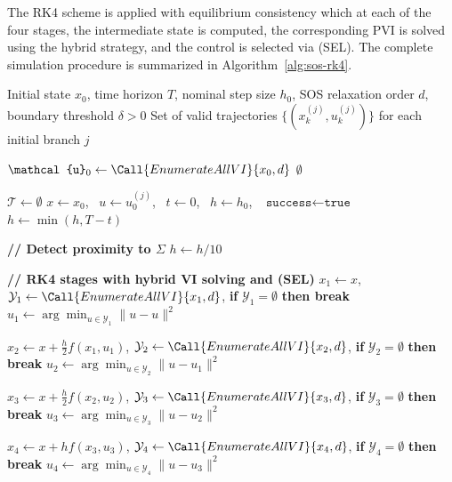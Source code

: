 \documentclass[sn-basic,Numbered]{sn-jnl}
\theoremstyle{thmstyleone}%
\begin{document}
The RK4 scheme is applied with equilibrium consistency which at each of the four stages, the intermediate state is computed, the corresponding PVI is solved using the hybrid strategy, and the control is selected via (SEL). The complete simulation procedure is summarized in Algorithm~\ref{alg:sos-rk4}.

\begin{algorithm}[htbp]
\caption{SOS-PDVIRK4 with Adaptive Hybrid VI Solver}
\label{alg:sos-rk4}
\begin{algorithmic}[1]
\Require 
    Initial state $x_0$, time horizon $T$, nominal step size $h_0$, 
    SOS relaxation order $d$, boundary threshold $\delta > 0$
\Ensure 
    Set of valid trajectories $\{(x_k^{(j)}, u_k^{(j)})\}$ for each initial branch $j$

\State $\mathcal{u}_0 \gets \Call{EnumerateAllVI}{x_0, d}$
 \Return $\emptyset$ \EndIf

\State $\mathcal{T} \gets \emptyset$
    \State $x \gets x_0$, \ $u \gets u_0^{(j)}$, \ $t \gets 0$, \ $h \gets h_0$, \ $\texttt{success} \gets \texttt{true}$
        \State $h \gets \min(h, T - t)$
        
        \Statex \textbf{// Detect proximity to $\Sigma$}
            \State $h \gets h / 10$ 
        \EndIf
        
        \Statex \textbf{// RK4 stages with hybrid VI solving and (SEL)}
        \State $x_1 \gets x$, \quad $\mathcal{Y}_1 \gets \Call{EnumerateAllVI}{x_1, d}$, \quad \textbf{if} $\mathcal{Y}_1 = \emptyset$ \textbf{then break}
        \State $u_1 \gets \arg\min_{u \in \mathcal{Y}_1} \| u - u \|^2$
        
        \State $x_2 \gets x + \tfrac{h}{2} f(x_1, u_1)$, \quad $\mathcal{Y}_2 \gets \Call{EnumerateAllVI}{x_2, d}$, \quad \textbf{if} $\mathcal{Y}_2 = \emptyset$ \textbf{then break}
        \State $u_2 \gets \arg\min_{u \in \mathcal{Y}_2} \| u - u_1 \|^2$
        
        \State $x_3 \gets x + \tfrac{h}{2} f(x_2, u_2)$, \quad $\mathcal{Y}_3 \gets \Call{EnumerateAllVI}{x_3, d}$, \quad \textbf{if} $\mathcal{Y}_3 = \emptyset$ \textbf{then break}
        \State $u_3 \gets \arg\min_{u \in \mathcal{Y}_3} \| u - u_2 \|^2$
        
        \State $x_4 \gets x + h f(x_3, u_3)$, \quad $\mathcal{Y}_4 \gets \Call{EnumerateAllVI}{x_4, d}$, \quad \textbf{if} $\mathcal{Y}_4 = \emptyset$ \textbf{then break}
        \State $u_4 \gets \arg\min_{u \in \mathcal{Y}_4} \| u - u_3 \|^2$
        

\end{algorithmic}
\end{algorithm}
\end{document}
